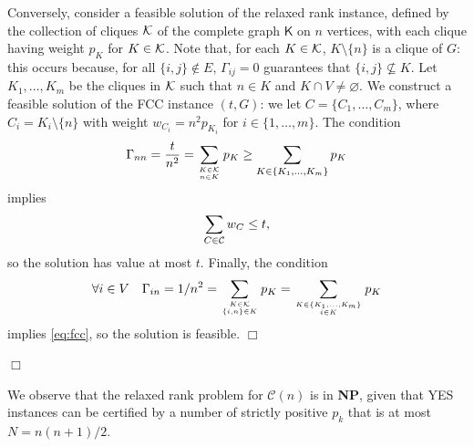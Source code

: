 \documentclass[envcountsect,envcountsame]{svjour3}
\theoremstyle{changebreak}                %
\newenvironment{proof}
 {{\sl Proof.}\hspace*{1 ex}}%
 {{\nopagebreak\hspace*{\fill}$\Box$\par\vspace{12pt}}}
\newcommand{\qed}{\hfill \ensuremath{\Box}}
\newcommand{\CONX}[1]{\mathcal{C}(#1)}
\def\K{{\cal K}}
\def\C{{\cal C}}
\begin{document}
\begin{proof}
Conversely, consider a feasible solution of the relaxed rank instance, defined by the collection of cliques $\K$ of the complete graph $\mathsf{K}$ on $n$ vertices, with each clique having weight $p_K$ for $K\in\K$. Note that, for each $K\in\K$, $K\setminus\{n\}$ is a clique of $G$: this occurs because, for all $\{i,j\}\notin E$, $\Gamma_{ij}=0$ guarantees that $\{i,j\}\not\subseteq K$. Let $K_1,\ldots,K_m$ be the cliques in $\K$ such that $n\in K$ and $K\cap V\not=\varnothing$. We construct a feasible solution of the FCC instance $(t,G)$: we let $C=\{C_1,\ldots,C_m\}$, where $C_i=K_i\setminus\{n\}$ with weight $w_{C_i}=n^2 p_{K_i}$ for $i\in\{1,\ldots,m\}$. The condition
\[\Gamma_{nn} = \frac{t}{n^2} = \sum\limits_{K\in\K\atop n\in K} p_K \geq \sum\limits_{K\in\{K_1,\ldots,K_m\}} p_K\]
implies
\[\sum\limits_{C\in\C} w_C \leq t,\]
so the solution has value at most $t$. Finally, the condition
\[\forall i\in V\quad \Gamma_{in} = 1/n^2 = \sum\limits_{K\in\K\atop\{i,n\}\in K} p_K = \sum\limits_{K\in\{K_1,\ldots,K_m\}\atop i\in K} p_K\]
implies \eqref{eq:fcc}, so the solution is feasible. \ifspringer\qed\fi
\end{proof}
We observe that the relaxed rank problem for $\CONX{n}$ is in \textbf{NP}, given that YES instances can be certified by a number of strictly positive $p_k$ that is at most $N=n(n+1)/2$.
\end{document}
